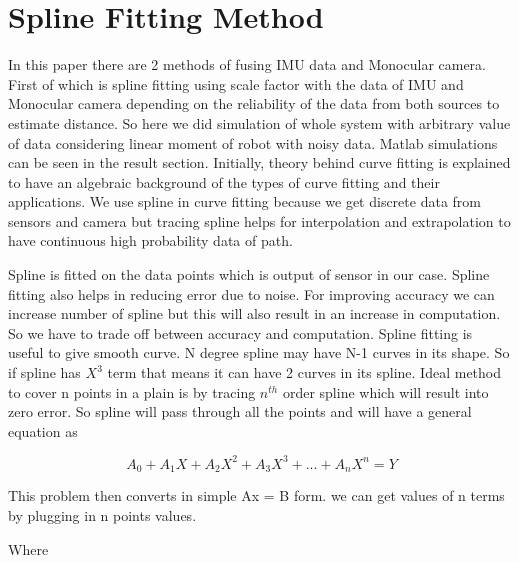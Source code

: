 \section{Spline Fitting Method}
\label{Spline_1}

In this paper there are 2 methods of fusing IMU data and Monocular camera. First of which is spline fitting using scale factor with the data of IMU and Monocular camera depending on the reliability of the data from both sources to estimate distance. So here we did simulation of whole system with arbitrary value of data considering linear moment of robot with noisy data. Matlab simulations can be seen in the result section. Initially, theory behind curve fitting is explained to have an algebraic background of the types of curve fitting and their applications. We use spline in curve fitting because we get discrete data from sensors and camera but tracing spline helps for interpolation and extrapolation to have continuous high probability data of path.

Spline is fitted on the data points which is output of sensor in our case. Spline fitting also helps in reducing error due to noise. For improving accuracy we can increase number of spline but this will also result in an increase in computation. So we have to trade off between accuracy and computation.
Spline fitting is useful to give smooth curve. N degree spline may have N-1 curves in its shape. So if spline has $X^3$ term that means it can have 2 curves in its spline. Ideal method to cover n points in a plain is by tracing $n^{th}$ order spline which will result into zero error. So spline will pass through all the points and will have a general equation as

\begin{equation}
\ A_{0} +A_{1}X +A_{2}X^{2}+A_{3}X^{3} + ... + A_{n}X^{n} = Y
\end{equation} 

This problem then converts in simple Ax = B form. we can get values of n terms by plugging in n points values.

Where

